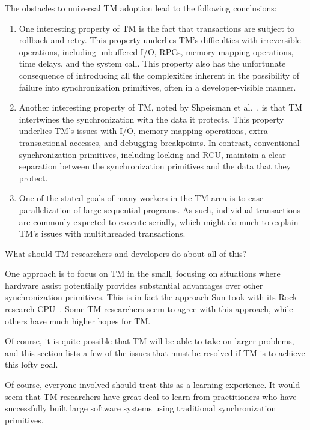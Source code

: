 The obstacles to universal TM adoption lead to the following
conclusions:

\begin{enumerate}
\item	One interesting property of TM is the fact that transactions are
	subject to rollback and retry.
	This property underlies TM's difficulties with irreversible
	operations, including unbuffered I/O, RPCs, memory-mapping
	operations, time delays, and the  system call.
	This property also has the unfortunate consequence of introducing
	all the complexities inherent in the possibility of
	failure into synchronization primitives, often in a developer-visible
	manner.
\item	Another interesting property of TM, noted by
	Shpeisman et al.~\cite{TatianaShpeisman2009CppTM}, is that TM
	intertwines the synchronization with the data it protects.
	This property underlies TM's issues with I/O, memory-mapping
	operations, extra-transactional accesses, and debugging
	breakpoints.
	In contrast, conventional synchronization primitives, including
	locking and RCU, maintain a clear separation between the
	synchronization primitives and the data that they protect.
\item	One of the stated goals of many workers in the TM area is to
	ease parallelization of large sequential programs.
	As such, individual transactions are commonly expected to
	execute serially, which might do much to explain TM's issues
	with multithreaded transactions.
\end{enumerate}

What should TM researchers and developers do about all of this?

One approach is to focus on TM in the small, focusing on situations
where hardware assist potentially provides substantial advantages over
other synchronization primitives.
This is in fact the approach Sun took with its Rock research
CPU~\cite{DaveDice2009ASPLOSRockHTM}.
Some TM researchers seem to agree with this approach, while others have
much higher hopes for TM.

Of course, it is quite possible that TM will be able to take on larger
problems, and this section lists a few of the issues that
must be resolved if TM is to achieve this lofty goal.

Of course, everyone involved should treat this as a learning experience.
It would seem that TM researchers have great deal to learn from
practitioners who have successfully built large software systems using
traditional synchronization primitives.

